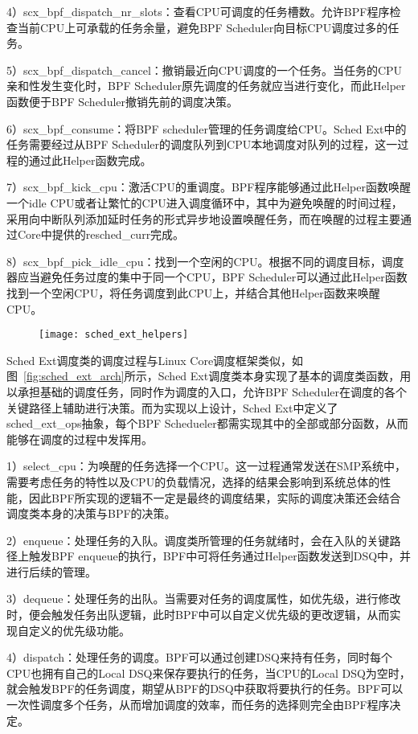 4）scx\_bpf\_dispatch\_nr\_slots：查看CPU可调度的任务槽数。允许BPF程序检查当前CPU上可承载的任务余量，避免BPF Scheduler向目标CPU调度过多的任务。

5）scx\_bpf\_dispatch\_cancel：撤销最近向CPU调度的一个任务。当任务的CPU亲和性发生变化时，BPF Scheduler原先调度的任务就应当进行变化，而此Helper函数便于BPF Scheduler撤销先前的调度决策。

6）scx\_bpf\_consume：将BPF scheduler管理的任务调度给CPU。Sched Ext中的任务需要经过从BPF Scheduler的调度队列到CPU本地调度对队列的过程，这一过程的通过此Helper函数完成。

7）scx\_bpf\_kick\_cpu：激活CPU的重调度。BPF程序能够通过此Helper函数唤醒一个idle CPU或者让繁忙的CPU进入调度循环中，其中为避免唤醒的时间过程，采用向中断队列添加延时任务的形式异步地设置唤醒任务，而在唤醒的过程主要通过Core中提供的resched\_curr完成。

8）scx\_bpf\_pick\_idle\_cpu：找到一个空闲的CPU。根据不同的调度目标，调度器应当避免任务过度的集中于同一个CPU，BPF Scheduler可以通过此Helper函数找到一个空闲CPU，将任务调度到此CPU上，并结合其他Helper函数来唤醒CPU。

\begin{figure}[!htbp]
    \centering
    \texttt{[image: sched\_ext\_helpers]}
    \label{fig:sched_ext_helpers}
\end{figure}

Sched Ext调度类的调度过程与Linux Core调度框架类似，如图~\ref{fig:sched_ext_arch}所示，Sched Ext调度类本身实现了基本的调度类函数，用以承担基础的调度任务，同时作为调度的入口，允许BPF Scheduler在调度的各个关键路径上辅助进行决策。而为实现以上设计，Sched Ext中定义了sched\_ext\_ops抽象，每个BPF Schedueler都需实现其中的全部或部分函数，从而能够在调度的过程中发挥用。

1）select\_cpu：为唤醒的任务选择一个CPU。这一过程通常发送在SMP系统中，需要考虑任务的特性以及CPU的负载情况，选择的结果会影响到系统总体的性能，因此BPF所实现的逻辑不一定是最终的调度结果，实际的调度决策还会结合调度类本身的决策与BPF的决策。

2）enqueue：处理任务的入队。调度类所管理的任务就绪时，会在入队的关键路径上触发BPF enqueue的执行，BPF中可将任务通过Helper函数发送到DSQ中，并进行后续的管理。

3）dequeue：处理任务的出队。当需要对任务的调度属性，如优先级，进行修改时，便会触发任务出队逻辑，此时BPF中可以自定义优先级的更改逻辑，从而实现自定义的优先级功能。

4）dispatch：处理任务的调度。BPF可以通过创建DSQ来持有任务，同时每个CPU也拥有自己的Local DSQ来保存要执行的任务，当CPU的Local DSQ为空时，就会触发BPF的任务调度，期望从BPF的DSQ中获取将要执行的任务。BPF可以一次性调度多个任务，从而增加调度的效率，而任务的选择则完全由BPF程序决定。

